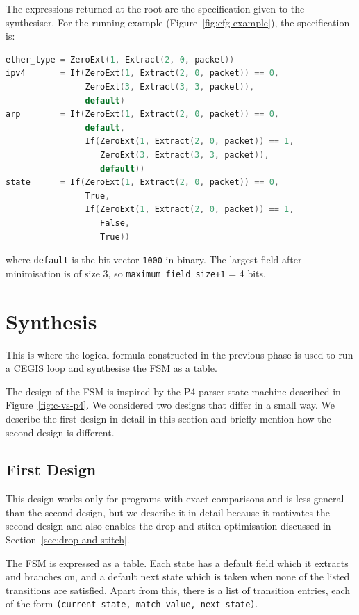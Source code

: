 The expressions returned at the root are the specification given to
the synthesiser. For the running example
(Figure~\ref{fig:cfg-example}), the specification is:

\begin{lstlisting}[style=codeside, language=C]
ether_type = ZeroExt(1, Extract(2, 0, packet))
ipv4       = If(ZeroExt(1, Extract(2, 0, packet)) == 0,
                ZeroExt(3, Extract(3, 3, packet)),
                default)
arp        = If(ZeroExt(1, Extract(2, 0, packet)) == 0,
                default,
                If(ZeroExt(1, Extract(2, 0, packet)) == 1,
                   ZeroExt(3, Extract(3, 3, packet)),
                   default))
state      = If(ZeroExt(1, Extract(2, 0, packet)) == 0,
                True,
                If(ZeroExt(1, Extract(2, 0, packet)) == 1,
                   False,
                   True))
\end{lstlisting}

where \texttt{default} is the bit-vector \texttt{1000} in binary.
The largest field after minimisation is of size 3, so
\texttt{maximum\_field\_size+1} = 4 bits.


\section{Synthesis}
\label{sec:synthesis}

This is where the logical formula constructed in the previous phase
is used to run a CEGIS loop and synthesise the FSM as a
table.

The design of the FSM is inspired by the P4 parser state
machine described in Figure~\ref{fig:c-vs-p4}. We considered two
designs that differ in a small way. We describe the first design in
detail in this section and briefly mention how the second design is 
different.

\subsection{First Design}

This design works only for programs with exact comparisons and is less general than the 
second design, but we describe it in detail because it
motivates the second design and also enables the drop-and-stitch
optimisation discussed in Section~\ref{sec:drop-and-stitch}.

The FSM is expressed as a table. Each state has a default
field which it extracts and branches on, and a default next state
which is taken when none of the listed transitions are satisfied.
Apart from this, there is a list of transition entries, each of the
form \texttt{(current\_state, match\_value, next\_state)}.

